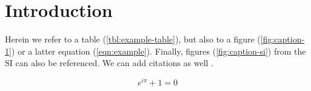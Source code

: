 

\section{Introduction}

Herein we refer to a table (\cref{tbl:example-table}), but also to a figure
(\cref{fig:caption-1}) or a latter equation (\cref{eqn:example}). Finally,
figures (\cref{fig:caption-si}) from the SI can also be referenced. We can add
citations as well \citep{example}.

\lipsum[1]{}

\begin{equation}\label{eqn:example}
    e^{i\pi} + 1 = 0
\end{equation}

\lipsum[2-5]{}